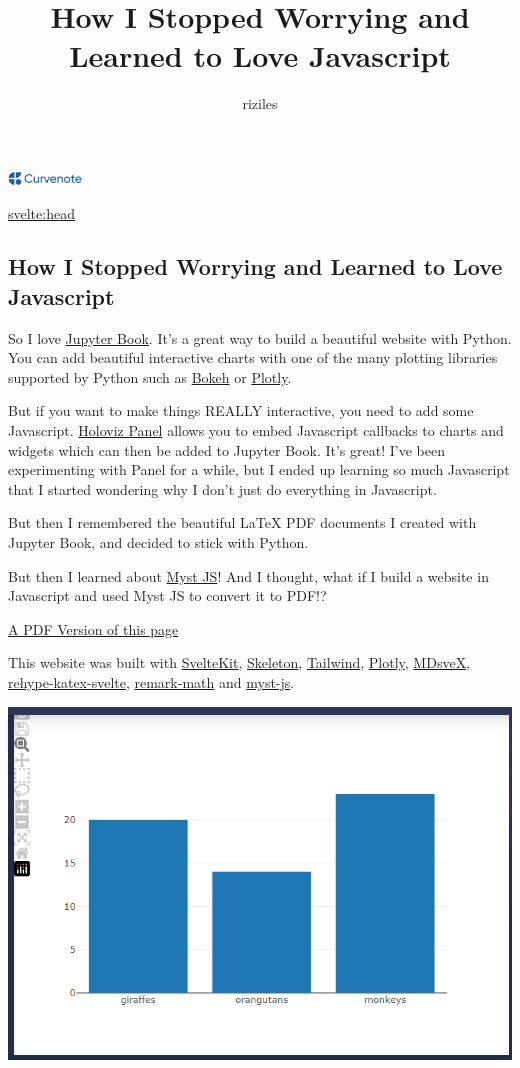 \documentclass{article}
\title{How I Stopped Worrying and Learned to Love Javascript}
\author{riziles}
\date{\displaydate{articleDate}}
\newcommand{\logo}{
  \href{https://curvenote.com}{\includegraphics[width=2cm]{curvenote.png}}
}
\begin{document}
\maketitle
\begin{center}\logo\end{center}


\url{svelte:head}

\subsection*{How I Stopped Worrying and Learned to Love Javascript}

So I love \href{https://jupyterbook.org/en/stable/start/your-first-book.html}{Jupyter Book}.
It's a great way to build a beautiful website with Python.
You can add beautiful interactive charts with one of the many plotting libraries supported by Python
such as \href{https://bokeh.org/}{Bokeh} or \href{https://plotly.com/python/}{Plotly}.

But if you want to make things REALLY interactive, you need to add some Javascript.
\href{https://panel.holoviz.org/user_guide/Links.html#defining-javascript-callbacks}{Holoviz Panel}
allows you to embed Javascript callbacks to charts and widgets which
can then be added to Jupyter Book. It's great! I've been experimenting with Panel for a while,
but I ended up learning so much Javascript that I started wondering why I don't just do everything in Javascript.

But then I remembered the beautiful LaTeX PDF documents I created with Jupyter Book,
and decided to stick with Python.

But then I learned about \href{https://myst-tools.org/docs/mystjs}{Myst JS}! And I thought,
what if I build a website in Javascript and used Myst JS to convert it to PDF!?

\href{%7BassStr%7D/my-document.pdf}{A PDF Version of this page}

This website was built with
\href{https://kit.svelte.dev/}{SvelteKit},
\href{https://www.skeleton.dev/}{Skeleton},
\href{https://tailwindcss.com/}{Tailwind},
\href{https://plotly.com/javascript/}{Plotly},
\href{https://mdsvex.pngwn.io/}{MDsveX},
\href{https://github.com/kwshi/rehype-katex-svelte}{rehype-katex-svelte},
\href{https://github.com/remarkjs/remark-math}{remark-math} and
\href{https://github.com/executablebooks/mystjs}{myst-js}.

\includegraphics[width=0.7\linewidth]{images/Capture-037f1a6709c029d6e4166b657d95e6ef.PNG}
\end{document}
